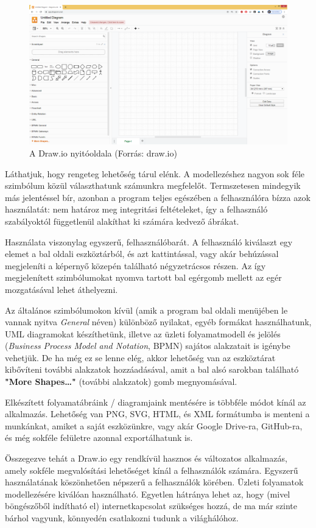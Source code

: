 \begin{figure}[h]
\centering
\includegraphics[scale=0.3]{images/drawio.png}
\caption{A Draw.io nyitóoldala (Forrás: draw.io)}
\label{fig:drawio}
\end{figure}

Láthatjuk, hogy rengeteg lehetőség tárul elénk. A modellezéshez nagyon sok féle szimbólum közül választhatunk számunkra megfelelőt. Termszetesen mindegyik más jelentéssel bír, azonban a program teljes egészében a felhasználóra bízza azok használatát: nem határoz meg integritási feltételeket, így a felhasználó szabályoktól függetlenül alakíthat ki számára kedvező ábrákat.

Használata viszonylag egyszerű, felhasználóbarát. A felhasználó kiválaszt egy elemet a bal oldali eszköztárból, és azt kattintással, vagy akár behúzással megjeleníti a képernyő közepén található négyzetrácsos részen. Az így megjelenített szimbólumokat nyomva tartott bal egérgomb mellett az egér mozgatásával lehet áthelyezni.

Az általános szimbólumokon kívül (amik a program bal oldali menüjében le vannak nyitva \textit{General} néven) különböző nyilakat, egyéb formákat használhatunk, UML diagramokat készíthetünk, illetve az üzleti folyamatmodell és jelölés (\textit{Business Process Model and Notation}, BPMN) sajátos alakzatait is igénybe vehetjük. De ha még ez se lenne elég, akkor lehetőség van az eszköztárat kibővíteni további alakzatok hozzáadásával, amit a bal alsó sarokban található \textbf{"More Shapes\ldots"} (további alakzatok) gomb megnyomásával.

Elkészített folyamatábráink / diagramjaink mentésére is többféle módot kínál az alkalmazás. Lehetőség van PNG, SVG, HTML, és XML formátumba is menteni a munkánkat, amiket a saját eszközünkre, vagy akár Google Drive-ra, GitHub-ra, és még sokféle felületre azonnal exportálhatunk is.

Összegezve tehát a Draw.io egy rendkívül hasznos és változatos alkalmazás, amely sokféle megvalósítási lehetőséget kínál a felhasználók számára. Egyszerű használatának köszönhetően népszerű a felhasználók körében. Üzleti folyamatok modellezésére kiválóan használható. Egyetlen hátránya lehet az, hogy (mivel böngészőből indítható el) internetkapcsolat szükséges hozzá, de ma már szinte bárhol vagyunk, könnyedén csatlakozni tudunk a világhálóhoz.


